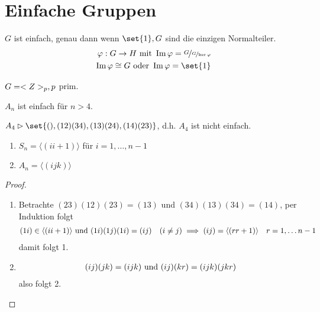\section{Einfache Gruppen}
\begin{definition}
	$G$ ist einfach, genau dann wenn $\set{1}, G$ sind die einzigen Normalteiler.
	\begin{align*}
		\phi: G \to H \mit \Image \phi = \lnkset{G}{\lnkset{G}{\ker \phi}}\\
		\Image \phi \cong G \oder \Image \phi = \set{1}
	\end{align*}
\end{definition}
\begin{*example}
	$G = <Z>_p,p$ prim.
\end{*example}
\begin{proposition}
	\label{prop_a_n_simple}
	$A_n$ ist einfach für $n > 4$.
\end{proposition}
\begin{*remark}
	$A_4 \rhd \set{(), (12)(34),(13)(24),(14)(23)}$, d.h. $A_4$ ist nicht einfach.
\end{*remark}
\begin{lemma}
	\begin{enumerate}
		\item $S_n = \langle (i i+1)\rangle$ für $i = 1, \dots, n -1$
		\item $A_n = \langle (ijk) \rangle$
	\end{enumerate}
\end{lemma}
\begin{proof}
	\begin{enumerate}
		\item 	Betrachte $(23)(12)(23) = (13)$ und $(34)(13)(34) = (14)$, per Induktion folgt 
		\begin{align*}
		(1i) \in \langle (i i+1)\rangle \text{ und } (1i)(1j)(1i) = (ij) \quad (i \neq j)
		\implies (ij) = \langle (r r+1) \rangle \quad r = 1,\dots n-1
		\end{align*}
		damit folgt 1.
		\item 
		\begin{align*}
			(ij)(jk) = (ijk) \text{ und } (ij)(kr) = (ijk)(jkr)
		\end{align*}
		also folgt 2.
	\end{enumerate}
\end{proof}
